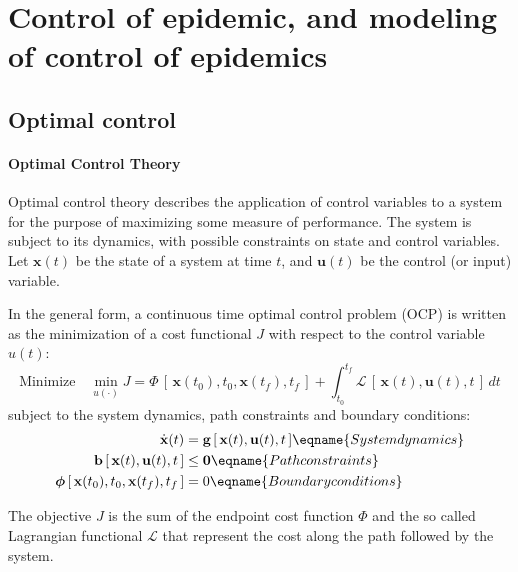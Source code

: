  \section{Control of epidemic, and modeling of control of epidemics}%



\subsection{Optimal control}
\paragraph{Optimal Control Theory}
Optimal control theory describes the application of control variables to a system for the purpose of maximizing some measure of performance. The system is subject to its dynamics, with possible constraints on state and control variables. Let $\textbf{x}(t)$ be the state of a system at time $t$, and $\textbf{u}(t)$ be the control (or input) variable. 

In the general form, a continuous time optimal control problem (OCP) is written as the minimization of a cost functional $J$  with respect to the control variable $u(t)$:
\begin{equation}
\text{Minimize~~~} \min_{u(\cdot)} J=\Phi\,[\,\textbf{x}(t_0),t_0,\textbf{x}(t_f),t_f\,] + \int_{t_0}^{t_f} \mathcal{L}\,[\,\textbf{x}(t),\textbf{u}(t),t\,] \,dt
\end{equation}
subject to the system dynamics, path constraints and boundary conditions:
\begin{align}
\dot{\textbf{x}}(t) & =  \textbf{g}\,[\,\textbf{x}(t),\textbf{u}(t),t\,] \eqname{System dynamics}\\
\textbf{b}\,[\,\textbf{x}(t),\textbf{u}(t),t\,]  & \leq  \textbf{0} \eqname{Path constraints} \\
\boldsymbol{\phi}\,[\,\textbf{x}(t_0),t_0,\textbf{x}(t_f),t_f\,] & =  0 \eqname{Boundary conditions} 
\end{align}

The objective $J$ is the sum of the endpoint cost function $\Phi$ and the so called Lagrangian functional $\mathcal{L}$ that represent the cost along the path followed by the system.

